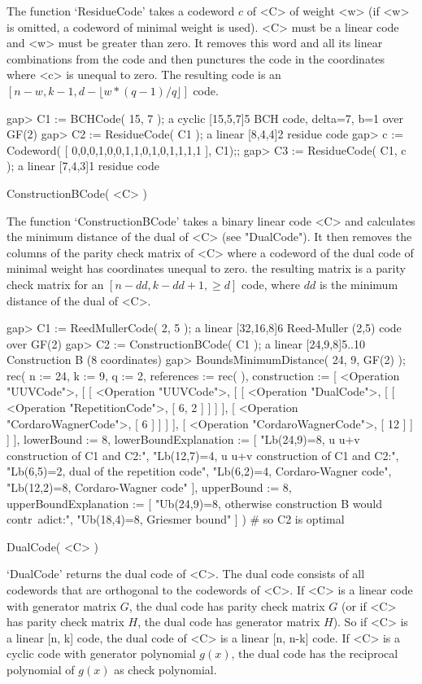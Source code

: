 The function `ResidueCode' takes a codeword $c$  of <C> of weight <w> (if
<w> is  omitted, a codeword  of minimal weight is  used).  <C> must  be a
linear code and <w>  must be greater than zero.  It removes this word and
all its linear combinations from the code and then  punctures the code in
the coordinates where <c> is unequal  to zero.  The  resulting code is an
$[n-w, k-1, d-\lfloor w*(q-1)/q \rfloor ]$ code.

\beginexample
gap> C1 := BCHCode( 15, 7 );
a cyclic [15,5,7]5 BCH code, delta=7, b=1 over GF(2)
gap> C2 := ResidueCode( C1 );
a linear [8,4,4]2 residue code
gap> c := Codeword( [ 0,0,0,1,0,0,1,1,0,1,0,1,1,1,1 ], C1);;
gap> C3 := ResidueCode( C1, c );
a linear [7,4,3]1 residue code 
\endexample

\>ConstructionBCode( <C> )

The function  `ConstructionBCode' takes  a   binary linear code   <C> and
calculates the minimum  distance of the dual  of <C> (see "DualCode"). It
then  removes the  columns  of the  parity  check  matrix of <C>  where a
codeword of  the dual code of minimal  weight  has coordinates unequal to
zero. the resulting matrix   is a  parity  check  matrix for   an $[n-dd,
k-dd+1, \geq d]$ code, where $dd$ is the minimum distance  of the dual of
<C>.

\beginexample
gap> C1 := ReedMullerCode( 2, 5 );
a linear [32,16,8]6 Reed-Muller (2,5) code over GF(2)
gap> C2 := ConstructionBCode( C1 );
a linear [24,9,8]5..10 Construction B (8 coordinates)
gap> BoundsMinimumDistance( 24, 9, GF(2) );
rec( n := 24, k := 9, q := 2, references := rec(  ), 
  construction := [ <Operation "UUVCode">, 
      [ [ <Operation "UUVCode">, [ [ <Operation "DualCode">, 
                      [ [ <Operation "RepetitionCode">, [ 6, 2 ] ] ] ], 
                  [ <Operation "CordaroWagnerCode">, [ 6 ] ] ] ], 
          [ <Operation "CordaroWagnerCode">, [ 12 ] ] ] ], lowerBound := 8, 
  lowerBoundExplanation := [ "Lb(24,9)=8, u u+v construction of C1 and C2:", 
      "Lb(12,7)=4, u u+v construction of C1 and C2:", 
      "Lb(6,5)=2, dual of the repetition code", 
      "Lb(6,2)=4, Cordaro-Wagner code", "Lb(12,2)=8, Cordaro-Wagner code" ], 
  upperBound := 8, 
  upperBoundExplanation := [ "Ub(24,9)=8, otherwise construction B would contr\
adict:", "Ub(18,4)=8, Griesmer bound" ] )
# so C2 is optimal
\endexample

\>DualCode( <C> )

`DualCode' returns the  dual code of  <C>. The dual  code consists of all
codewords that are orthogonal to the codewords of <C>. If <C> is a linear
code with generator matrix $G$, the dual code has parity check matrix $G$
(or  if  <C> has  parity  check matrix $H$,  the  dual code has generator
matrix $H$). So if <C> is a linear [n, k] code, the dual code of <C> is a
linear [n,  n-k] code. If <C> is  a cyclic code with generator polynomial
$g(x)$, the dual code  has the reciprocal  polynomial of $g(x)$ as  check
polynomial.

